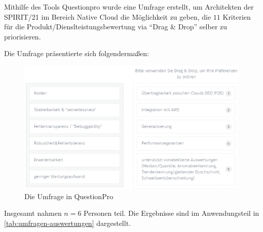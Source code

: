 \label{anhang:umfrage}
Mithilfe des Tools Questionpro wurde eine Umfrage erstellt, um Architekten der SPIRIT/21 im Bereich Native Cloud die Möglichkeit zu geben, die $11$ Kriterien für die Produkt/Dienslteistungsbewertung via \enquote{Drag \& Drop} selber zu priorisieren.

Die Umfrage präsentierte sich folgendermaßen:

\begin{figure}[H]
\centering
\includegraphics[width=\textwidth]{graphics/Umfrage-Darstellung.png}
\caption{Die Umfrage in QuestionPro}
\label{abb:Umfrage}
\end{figure}

Insgesamt nahmen $n = 6$ Personen teil. Die Ergebnisse sind im Anwendungsteil in \autoref{tab:umfragen-auswertungen} dargestellt.